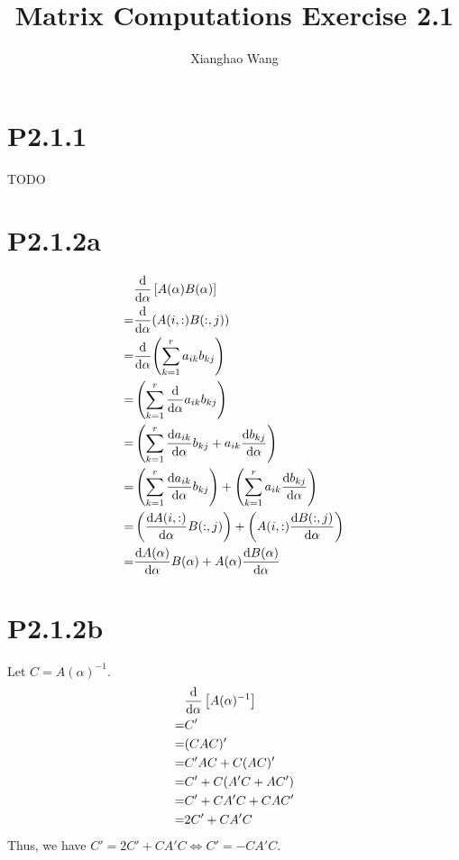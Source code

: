 \documentclass{article}
\author{Xianghao Wang}
\title{Matrix Computations Exercise 2.1}
\begin{document}
\maketitle

\newcommand{\floor}[1]{\lfloor#1\rfloor}

\section*{P2.1.1}
TODO


\section*{P2.1.2a}
\begin{align*}
      & \dv{\alpha}\left[A(\alpha)B(\alpha)\right]                                   \\
    = & \dv{\alpha} (A(i,:)B(:,j))                                                   \\
    = & \dv{\alpha} (\sum_{k=1}^ra_{ik}b_{kj})                                       \\
    = & \left(\sum_{k=1}^r \dv{\alpha}a_{ik}b_{kj} \right)                           \\
    = & \left(\sum_{k=1}^r\dv{a_{ik}}{\alpha}b_{kj}+a_{ik}\dv{b_{kj}}{\alpha}\right) \\
    = & \left(\sum_{k=1}^r\dv{a_{ik}}{\alpha}b_{kj}\right)+
    \left(\sum_{k=1}^ra_{ik}\dv{b_{kj}}{\alpha}\right)                               \\
    = & \left(\dv{A(i,:)}{\alpha}B(:,j)\right)+
    \left(A(i,:)\dv{B(:,j)}{\alpha}\right)                                           \\
    = & \dv{A(\alpha)}{\alpha}B(\alpha)+A(\alpha)\dv{B(\alpha)}{\alpha}
\end{align*}

\section*{P2.1.2b}
Let $C=A(\alpha)^{-1}$.
\begin{align*}
      & \dv{\alpha}\left[A(\alpha)^{-1}\right] \\
    = & C'                                     \\
    = & (CAC)'                                 \\
    = & C'AC+C(AC)'                            \\
    = & C'+C(A'C+AC')                          \\
    = & C'+CA'C+CAC'                           \\
    = & 2C'+CA'C
\end{align*}
Thus, we have $C'=2C'+CA'C \iff C'=-CA'C$.
\end{document}
